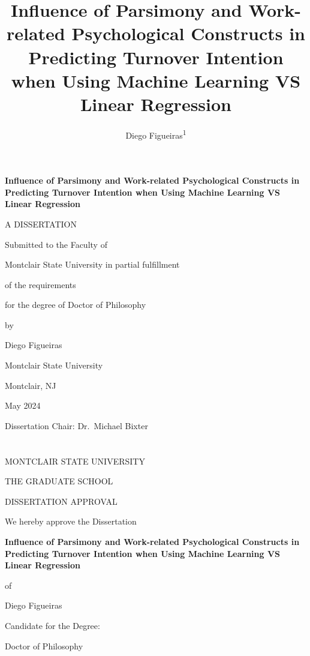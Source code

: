 \documentclass[
  man]{apa7}
\title{Influence of Parsimony and Work-related Psychological Constructs in Predicting Turnover Intention when Using Machine Learning VS Linear Regression}
\author{Diego Figueiras\textsuperscript{1}}
\date{}
\affiliation{\vspace{0.5cm}\textsuperscript{1} Montclai State University}
\begin{document}
\maketitle

\renewcommand{\headrulewidth}{0pt}
\renewcommand{\footrulewidth}{0pt}
\phantom{i'm a ghost}
\vskip 1.0in
\begin{center}

\textbf{Influence of Parsimony and Work-related Psychological Constructs in Predicting Turnover Intention when Using Machine Learning VS Linear Regression}

\vskip 0.8in

A DISSERTATION

\vskip 0.8in

Submitted to the Faculty of

Montclair State University in partial fulfillment

of the requirements

for the degree of Doctor of Philosophy

\vskip 0.4in

by

Diego Figueiras

Montclair State University

Montclair, NJ

May 2024

\end{center}

\vskip 1.0in

Dissertation Chair: Dr.~Michael Bixter

\newpage

\section{}
\cfoot{}
\rhead{\thepage}

\renewcommand{\headrulewidth}{0pt}
\renewcommand{\footrulewidth}{0pt}

\onehalfspacing

\begin{center}

MONTCLAIR STATE UNIVERSITY

THE GRADUATE SCHOOL

DISSERTATION APPROVAL

\vskip 0.2in

We hereby approve the Dissertation

\vskip 0.2in

\textbf{Influence of Parsimony and Work-related Psychological Constructs in Predicting Turnover Intention when Using Machine Learning VS Linear Regression}

of

Diego Figueiras

Candidate for the Degree:

Doctor of Philosophy

\end{center}
\end{document}
